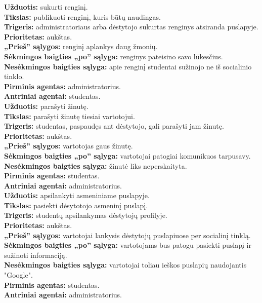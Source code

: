 \documentclass{VUMIFPSkursinis}
\begin{document}
\setlength{\parindent}{0pt}\textbf{Užduotis:} sukurti renginį. \\
\textbf{Tikslas:} publikuoti renginį, kuris būtų naudingas.\\
\textbf{Trigeris:} administratoriaus arba dėstytojo sukurtas renginys atsiranda puslapyje. \\
\textbf{Prioritetas:} aukštas. \\
\textbf{„Prieš” sąlygos:} renginį aplankys daug žmonių.\\
\textbf{Sėkmingos baigties „po” sąlyga:} renginys pateisino savo lūkesčius. \\
\textbf{Nesėkmingos baigties sąlyga:} apie renginį studentai sužinojo ne iš socialinio tinklo. \\
\textbf{Pirminis agentas:} administratorius. \\
\textbf{Antriniai agentai:} studentas. \\


\setlength{\parindent}{0pt}\textbf{Užduotis:} parašyti žinutę. \\
\textbf{Tikslas:} parašyti žinutę tiesiai vartotojui.\\
\textbf{Trigeris:} studentas, paspaudęs ant dėstytojo, gali parašyti jam žinutę. \\
\textbf{Prioritetas:} aukštas. \\
\textbf{„Prieš” sąlygos:} vartotojas gaus žinutę.\\
\textbf{Sėkmingos baigties „po” sąlyga:} vartotojai patogiai komunikuos tarpusavy. \\
\textbf{Nesėkmingos baigties sąlyga:} žinutė liks neperskaityta. \\
\textbf{Pirminis agentas:} studentas. \\
\textbf{Antriniai agentai:} administratorius.\\

\setlength{\parindent}{0pt} \textbf{Užduotis:} apsilankyti asmeniniame puslapyje. \\
\textbf{Tikslas:} pasiekti dėsytotojo asmeninį puslapį.\\
\textbf{Trigeris:} studentų apsilankymas dėstytojų profilyje. \\
\textbf{Prioritetas:} aukštas. \\
\textbf{„Prieš” sąlygos:} vartotojai lankysis dėstytojų puslapiuose per socialinį tinklą.\\
\textbf{Sėkmingos baigties „po” sąlyga:} vartotojams bus patogu pasiekti puslapį ir sužinoti informaciją. \\
\textbf{Nesėkmingos baigties sąlyga:} vartotojai toliau ieškos puslapių naudojantis "Google". \\
\textbf{Pirminis agentas:} studentas. \\
\textbf{Antriniai agentai:} administratorius.
\end{document}
